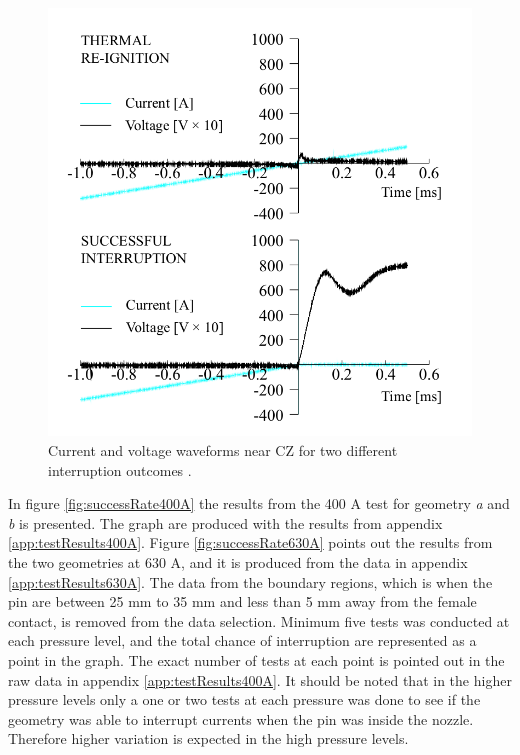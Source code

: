 \documentclass[10pt,a4paper]{article}
\begin{document}
\begin{figure}[H]
\centering
\includegraphics[scale=0.3]{Bilder/Results/differentInterruptions.png}
\caption{Current and voltage waveforms near CZ for two different interruption outcomes \cite{bib:AFIMVLBA}.} \label{fig:CurrentAndVoltageWaveform}
\end{figure}

In figure \ref{fig:successRate400A} the results from the 400 A test for geometry \textit{a} and \textit{b} is presented. The graph are produced with the results from appendix \ref{app:testResults400A}. Figure \ref{fig:successRate630A} points out the results from the two geometries at 630 A, and it is produced from the data in appendix \ref{app:testResults630A}. The data from the boundary regions, which is when the pin are between 25 mm to 35 mm and less than 5 mm away from the female contact, is removed from the data selection. Minimum five tests was conducted at each pressure level, and the total chance of interruption are represented as a point in the graph. The exact number of tests at each point is pointed out in the raw data in appendix \ref{app:testResults400A}. It should be noted that in the higher pressure levels only a one or two tests at each pressure was done to see if the geometry was able to interrupt currents when the pin was inside the nozzle. Therefore higher variation is expected in the high pressure levels.  
\end{document}
